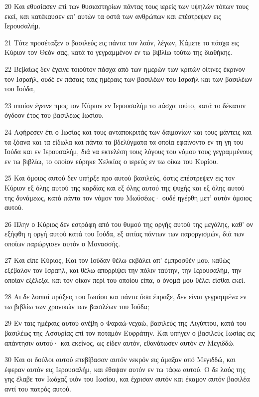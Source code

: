 \par 20 Και εθυσίασεν επί των θυσιαστηρίων πάντας τους ιερείς των υψηλών τόπων τους εκεί, και κατέκαυσεν επ' αυτών τα οστά των ανθρώπων και επέστρεψεν εις Ιερουσαλήμ.
\par 21 Τότε προσέταξεν ο βασιλεύς εις πάντα τον λαόν, λέγων, Κάμετε το πάσχα εις Κύριον τον Θεόν σας, κατά το γεγραμμένον εν τω βιβλίω τούτω της διαθήκης.
\par 22 Βεβαίως δεν έγεινε τοιούτον πάσχα από των ημερών των κριτών οίτινες έκρινον τον Ισραήλ, ουδέ εν πάσαις ταις ημέραις των βασιλέων του Ισραήλ και των βασιλέων του Ιούδα,
\par 23 οποίον έγεινε προς τον Κύριον εν Ιερουσαλήμ το πάσχα τούτο, κατά το δέκατον όγδοον έτος του βασιλέως Ιωσίου.
\par 24 Αφήρεσεν έτι ο Ιωσίας και τους ανταποκριτάς των δαιμονίων και τους μάντεις και τα ξόανα και τα είδωλα και πάντα τα βδελύγματα τα οποία εφαίνοντο εν τη γη του Ιούδα και εν Ιερουσαλήμ, διά να εκτελέση τους λόγους του νόμου τους γεγραμμένους εν τω βιβλίω, το οποίον εύρηκε Χελκίας ο ιερεύς εν τω οίκω του Κυρίου.
\par 25 Και όμοιος αυτού δεν υπήρξε προ αυτού βασιλεύς, όστις επέστρεψεν εις τον Κύριον εξ όλης αυτού της καρδίας και εξ όλης αυτού της ψυχής και εξ όλης αυτού της δυνάμεως, κατά πάντα τον νόμον του Μωϋσέως· ουδέ ηγέρθη μετ' αυτόν όμοιος αυτού.
\par 26 Πλην ο Κύριος δεν εστράφη από του θυμού της οργής αυτού της μεγάλης, καθ' ον εξήφθη η οργή αυτού κατά του Ιούδα, εξ αιτίας πάντων των παροργισμών, διά των οποίων παρώργισεν αυτόν ο Μανασσής.
\par 27 Και είπε Κύριος, Και τον Ιούδαν θέλω εκβάλει απ' έμπροσθέν μου, καθώς εξέβαλον τον Ισραήλ, και θέλω απορρίψει την πόλιν ταύτην, την Ιερουσαλήμ, την οποίαν εξέλεξα, και τον οίκον περί του οποίου είπα, ο όνομά μου θέλει είσθαι εκεί.
\par 28 Αι δε λοιπαί πράξεις του Ιωσίου και πάντα όσα έπραξε, δεν είναι γεγραμμένα εν τω βιβλίω των χρονικών των βασιλέων του Ιούδα;
\par 29 Εν ταις ημέραις αυτού ανέβη ο Φαραώ-νεχαώ, βασιλεύς της Αιγύπτου, κατά του βασιλέως της Ασσυρίας επί τον ποταμόν Ευφράτην. Και υπήγεν ο βασιλεύς Ιωσίας εις απάντησιν αυτού· και εκείνος, ως είδεν αυτόν, εθανάτωσεν αυτόν εν Μεγιδδώ.
\par 30 Και οι δούλοι αυτού επεβίβασαν αυτόν νεκρόν εις άμαξαν από Μεγιδδώ, και έφεραν αυτόν εις Ιερουσαλήμ, και έθαψαν αυτόν εν τω τάφω αυτού. Ο δε λαός της γης έλαβε τον Ιωάχαζ υιόν του Ιωσίου, και έχρισαν αυτόν και έκαμον αυτόν βασιλέα αντί του πατρός αυτού.
